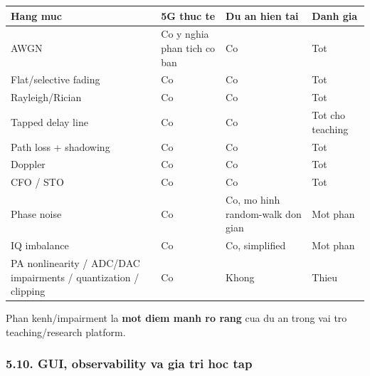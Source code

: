 \documentclass[
  vietnamese,
  a4paper,
  11pt]{article}
\newcounter{none} %
\begin{document}
{\def\LTcaptype{none} %
\begin{longtable}[]{@{}
  >{\raggedright\arraybackslash}p{}
  >{\raggedright\arraybackslash}p{}
  >{\raggedright\arraybackslash}p{}
  >{\raggedright\arraybackslash}p{}@{}}
\toprule\noalign{}
\begin{minipage}[b]{\linewidth}\raggedright
Hang muc
\end{minipage} & \begin{minipage}[b]{\linewidth}\raggedright
5G thuc te
\end{minipage} & \begin{minipage}[b]{\linewidth}\raggedright
Du an hien tai
\end{minipage} & \begin{minipage}[b]{\linewidth}\raggedright
Danh gia
\end{minipage} \\
\midrule\noalign{}
\endhead
\bottomrule\noalign{}
\endlastfoot
AWGN & Co y nghia phan tich co ban & Co & Tot \\
Flat/selective fading & Co & Co & Tot \\
Rayleigh/Rician & Co & Co & Tot \\
Tapped delay line & Co & Co & Tot cho teaching \\
Path loss + shadowing & Co & Co & Tot \\
Doppler & Co & Co & Tot \\
CFO / STO & Co & Co & Tot \\
Phase noise & Co & Co, mo hinh random-walk don gian & Mot phan \\
IQ imbalance & Co & Co, simplified & Mot phan \\
PA nonlinearity / ADC/DAC impairments / quantization / clipping & Co &
Khong & Thieu \\
\end{longtable}
}

Phan kenh/impairment la \textbf{mot diem manh ro rang} cua du an trong
vai tro teaching/research platform.

\subsubsection{5.10. GUI, observability va gia tri hoc
tap}\label{gui-observability-va-gia-tri-hoc-tap}
\end{document}
